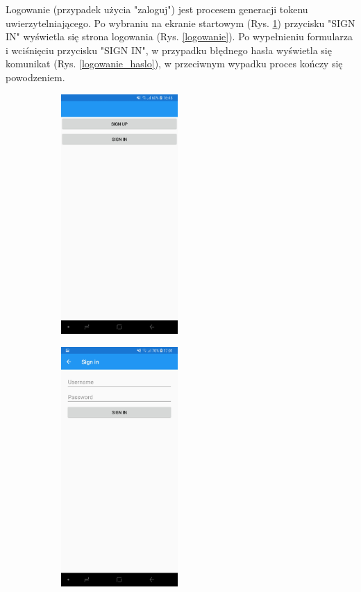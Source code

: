 {Logowanie} (przypadek użycia "zaloguj") jest procesem generacji tokenu uwierzytelniającego. Po wybraniu na ekranie startowym (Rys. \ref{ekran_startowy_logowanie}) przycisku "SIGN IN" wyświetla się strona logowania (Rys. \ref{logowanie}). Po wypełnieniu formularza i wciśnięciu przycisku "SIGN IN", w przypadku błędnego hasła wyświetla się komunikat (Rys. \ref{logowanie_haslo}), w przeciwnym wypadku proces kończy się powodzeniem.
\begin{figure}[!ht]
	\begin{center}
		\begin{subfigure}[b]{0.3\textwidth}
			\includegraphics[width=1.75in]{img/mobile/ekran_startowy.jpg}
			\label{ekran_startowy_logowanie}
		\end{subfigure}
		\begin{subfigure}[b]{0.3\textwidth}
			\includegraphics[width=1.75in]{img/mobile/login.jpg}

\end{subfigure}
\end{center}
\end{figure}
